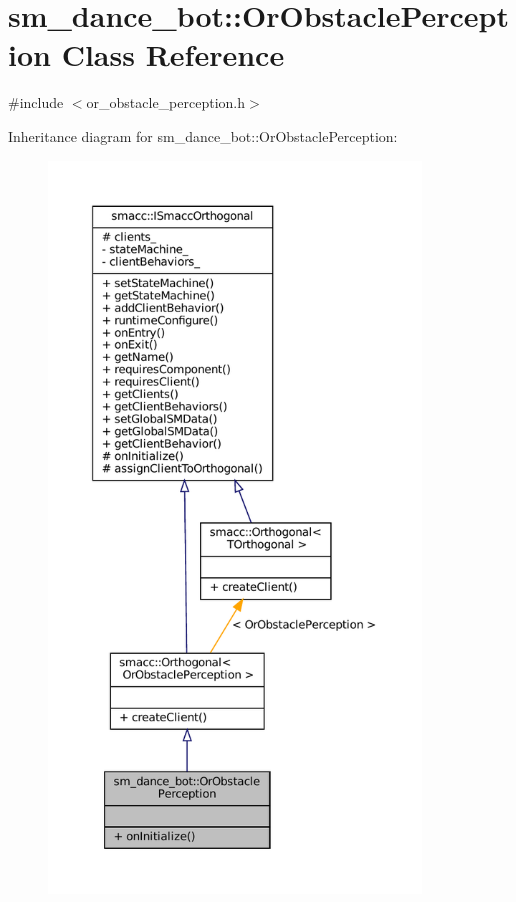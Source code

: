 \hypertarget{classsm__dance__bot_1_1OrObstaclePerception}{}\section{sm\+\_\+dance\+\_\+bot\+:\+:Or\+Obstacle\+Perception Class Reference}
\label{classsm__dance__bot_1_1OrObstaclePerception}


{\ttfamily \#include $<$or\+\_\+obstacle\+\_\+perception.\+h$>$}



Inheritance diagram for sm\+\_\+dance\+\_\+bot\+:\+:Or\+Obstacle\+Perception\+:
\nopagebreak
\begin{figure}[H]
\begin{center}
\leavevmode
\includegraphics[height=550pt]{classsm__dance__bot_1_1OrObstaclePerception__inherit__graph}
\end{center}
\end{figure}


